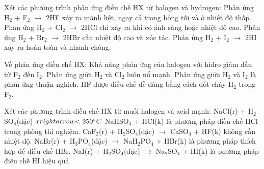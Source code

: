 \documentclass[Main.tex]{subfiles}
\begin{document}
    \begin{ex}
    Xét các phương trình phản ứng điều chế HX từ halogen và hydrogen:
    \choiceTF
    {\True Phản ứng H$_2$ + F$_2$ $\rightarrow$ 2HF xảy ra mãnh liệt, ngay cả trong bóng tối và ở nhiệt độ thấp.}
    {Phản ứng H$_2$ + Cl$_2$ $\rightarrow$ 2HCl chỉ xảy ra khi có ánh sáng hoặc nhiệt độ cao.}
    {\True Phản ứng H$_2$ + Br$_2$ $\rightarrow$ 2HBr cần nhiệt độ cao và xúc tác.}
    {Phản ứng H$_2$ + I$_2$ $\rightarrow$ 2HI xảy ra hoàn toàn và nhanh chóng.}
    \end{ex}
    
    \begin{ex}
    Về phản ứng điều chế HX:
    \choiceTF
    {\True Khả năng phản ứng của halogen với hidro giảm dần từ F$_2$ đến I$_2$.}
    {Phản ứng giữa H$_2$ và Cl$_2$ luôn nổ mạnh.}
    {\True Phản ứng giữa H$_2$ và I$_2$ là phản ứng thuận nghịch.}
    {\True HF được điều chế dễ dàng bằng cách đốt cháy H$_2$ trong F$_2$.}
    \end{ex}
    
    \begin{ex}
    Xét các phương trình điều chế HX từ muối halogen và acid mạnh:
    \choiceTF
    {\True NaCl(r) + H$_2$SO$_4$(đặc) $\\xrightarrow{< 250^\circ C}$ NaHSO$_4$ + HCl(k) là phương pháp điều chế HCl trong phòng thí nghiệm.}
    {CaF$_2$(r) + H$_2$SO$_4$(đặc) $\rightarrow$ CaSO$_4$ + HF(k) không cần nhiệt độ.}
    {\True NaBr(r) + H$_3$PO$_4$(đặc) $\rightarrow$ NaH$_2$PO$_4$ + HBr(k) là phương pháp thích hợp để điều chế HBr.}
    {NaI(r) + H$_2$SO$_4$(đặc) $\rightarrow$ Na$_2$SO$_4$ + HI(k) là phương pháp điều chế HI hiệu quả.}
    \end{ex}
    
\end{document}
